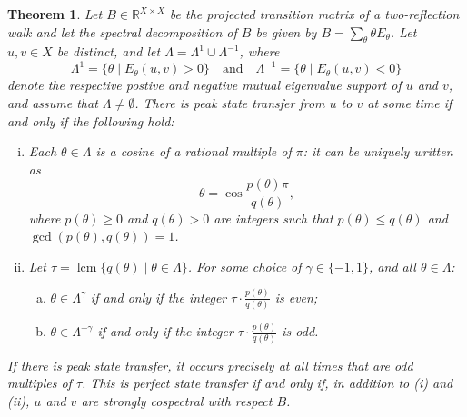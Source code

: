 \documentclass{article}
\newtheorem{theorem}{Theorem}[section]
\numberwithin{equation}{section}
\DeclareMathOperator{\lcm}{lcm}
\newcommand\re{{\mathbb R}}%
\begin{document}
\begin{theorem}\label{thm:PeakSTchar}
Let $B \in \re^{X \times X}$ be the projected transition matrix of a two-reflection walk and let the spectral decomposition of $B$ be given by $B = \sum_{\theta} \theta E_\theta$. Let $u,v \in X$ be distinct, and let $\Lambda = \Lambda^1 \cup \Lambda^{-1}$, where
\[
\Lambda^1 = \{\theta \mid E_\theta(u,v) > 0\} \quad \text{and} \quad \Lambda^{-1} = \{\theta \mid E_\theta(u,v) < 0\}
\]
denote the respective postive and negative mutual eigenvalue support of $u$ and $v$, and assume that $\Lambda \neq \emptyset$. There is peak state transfer from $u$ to $v$ at some time if and only if the following hold:
\begin{enumerate}[(i)]
\item Each $\theta \in \Lambda$ is a cosine of a rational multiple of $\pi$: it can be uniquely written as
\[
\theta = \cos\frac{p(\theta)\pi}{q(\theta)},
\]
where $p(\theta) \geq 0$ and $q(\theta) > 0$ are integers such that $p(\theta) \leq q(\theta)$ and $\gcd(p(\theta),q(\theta)) = 1$.
\item Let $\tau = \lcm\{q(\theta) \mid \theta \in \Lambda\}$. For some choice of $\gamma \in \{-1,1\}$, and all $\theta \in \Lambda$:
\begin{enumerate}[(a)]
    \item $\theta \in \Lambda^\gamma$ if and only if the integer $\tau \cdot \frac{p(\theta)}{q(\theta)}$ is even;
    \item $\theta \in \Lambda^{-\gamma}$ if and only if the integer $\tau \cdot \frac{p(\theta)}{q(\theta)}$ is odd.
\end{enumerate}
\end{enumerate}
If there is peak state transfer, it occurs precisely at all times that are odd multiples of $\tau$. This is perfect state transfer if and only if, in addition to (i) and (ii),  $u$ and $v$ are strongly cospectral with respect $B$.
\end{theorem}
\end{document}
